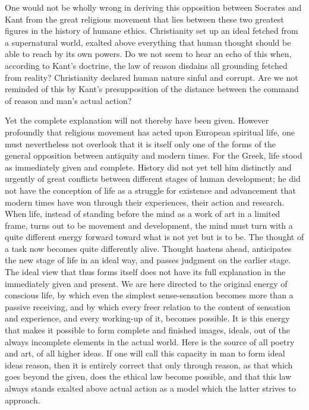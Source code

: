 \documentclass[12pt,a4paper,openany]{book}
\newcommand{\opage}[1]{\marginnote{\footnotesize\textit{[#1]}}}
\begin{document}
One would not be wholly wrong in deriving this opposition between Socrates and
Kant from the great religious movement that lies between these two greatest
figures in the history of humane ethics. Christianity set up an ideal fetched
from a supernatural world, exalted above everything that human thought should
be able to reach by its own powers. Do we not seem to hear an echo of this
when, according to Kant's doctrine, the law of reason disdains all grounding
fetched from reality? Christianity declared human nature sinful and corrupt.
Are we not reminded of this by Kant's presupposition of the distance between
the command of reason and man's actual action?

Yet the complete explanation will not thereby have been given. However
profoundly that religious movement has acted upon European spiritual life, one
must nevertheless not overlook that it is itself only one of the forms of the
general opposition between antiquity and modern times. For the Greek, life
stood as immediately given and complete. History did not yet tell him
distinctly and urgently of great conflicts between different stages of human
development; he did not have the conception of life as a struggle for
existence and \opage{50}advancement that modern times have won through their
experiences, their action and research. When life, instead of standing before
the mind as a work of art in a limited frame, turns out to be movement and
development, the mind must turn with a quite different energy forward toward
what is not yet but is to be. The thought of a task now becomes quite
differently alive. Thought hastens ahead, anticipates the new stage of life in
an ideal way, and passes judgment on the earlier stage. The ideal view that
thus forms itself does not have its full explanation in the immediately given
and present. We are here directed to the original energy of conscious life, by
which even the simplest sense-sensation becomes more than a passive receiving,
and by which every freer relation to the content of sensation and experience,
and every working-up of it, becomes possible. It is this energy that makes it
possible to form complete and finished images, ideals, out of the always
incomplete elements in the actual world. Here is the source of all poetry and
art, of all higher ideas. If one will call this capacity in man to form ideal
ideas reason, then it is entirely correct that only through reason, as that
which goes beyond the given, does the ethical law become possible, and that
this law always stands exalted above actual action as a model which the latter
strives to approach.
\end{document}
